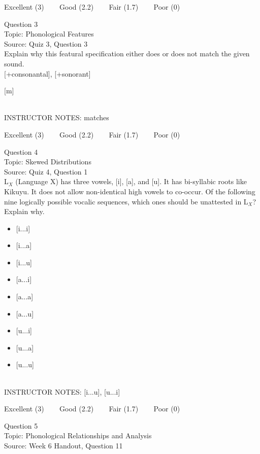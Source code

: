 \documentclass[12pt]{article}
\begin{document}
\vfill
Excellent (3) ~~~ Good (2.2) ~~~ Fair (1.7) ~~~ Poor (0)
\newpage

{\large Question 3}\\

Topic: Phonological Features\\
Source: Quiz 3, Question 3\\

Explain why this featural specification either does or does not match the given sound.\\

{[+consonantal]}, {[+sonorant]}

{[m]}


~\\
INSTRUCTOR NOTES: matches


\vfill
Excellent (3) ~~~ Good (2.2) ~~~ Fair (1.7) ~~~ Poor (0)
\newpage

{\large Question 4}\\

Topic: Skewed Distributions\\
Source: Quiz 4, Question 1\\

L$_X$ (Language X) has three vowels, [i], [a], and [u]. It has bi-syllabic roots like Kikuyu. It does not allow non-identical high vowels to co-occur. Of the following nine logically possible vocalic sequences, which ones should be unattested in L$_X$? Explain why.\\

\begin{itemize} \item {[i...i]} \item {[i...a]} \item {[i...u]} \item {[a...i]} \item {[a...a]} \item {[a...u]} \item {[u...i]} \item {[u...a]} \item {[u...u]} \end{itemize}


~\\
INSTRUCTOR NOTES: [i...u], [u...i]


\vfill
Excellent (3) ~~~ Good (2.2) ~~~ Fair (1.7) ~~~ Poor (0)
\newpage

{\large Question 5}\\

Topic: Phonological Relationships and Analysis\\
Source: Week 6 Handout, Question 11\\
\end{document}
